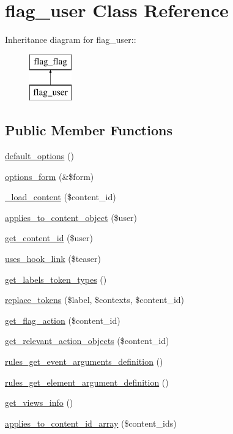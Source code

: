 \hypertarget{classflag__user}{
\section{flag\_\-user Class Reference}
\label{classflag__user}
}
Inheritance diagram for flag\_\-user::\begin{figure}[H]
\begin{center}
\leavevmode
\includegraphics[height=2cm]{classflag__user}
\end{center}
\end{figure}
\subsection*{Public Member Functions}
\begin{CompactItemize}
\item 
\hyperlink{classflag__user_5df658a9df123b09608c3438a06fe86e}{default\_\-options} ()
\item 
\hyperlink{classflag__user_2a425815ad46c2ffd8f48ded77d06231}{options\_\-form} (\&\$form)
\item 
\hyperlink{classflag__user_93152c6302f304279dba89e4b81af658}{\_\-load\_\-content} (\$content\_\-id)
\item 
\hyperlink{classflag__user_1166b6c58dbd8074dd5187f3c5b84c8b}{applies\_\-to\_\-content\_\-object} (\$user)
\item 
\hyperlink{classflag__user_3cb6ed47377662232c4f41bfe2f41f09}{get\_\-content\_\-id} (\$user)
\item 
\hyperlink{classflag__user_279b08bbeb85bdd35710b25e94ebba81}{uses\_\-hook\_\-link} (\$teaser)
\item 
\hyperlink{classflag__user_08790af167b1f4b273b5b8af7d3677b7}{get\_\-labels\_\-token\_\-types} ()
\item 
\hyperlink{classflag__user_7f311816450a6101d5ea132a41016d51}{replace\_\-tokens} (\$label, \$contexts, \$content\_\-id)
\item 
\hyperlink{classflag__user_6b753497cc4bd54f8328b8d0e7185142}{get\_\-flag\_\-action} (\$content\_\-id)
\item 
\hyperlink{classflag__user_92be6b0492226ca0feb1f2dc486d519e}{get\_\-relevant\_\-action\_\-objects} (\$content\_\-id)
\item 
\hyperlink{classflag__user_1773406a095155a3a1f6f8c0f099b85a}{rules\_\-get\_\-event\_\-arguments\_\-definition} ()
\item 
\hyperlink{classflag__user_7ff3a7690719f97b18be24006586f083}{rules\_\-get\_\-element\_\-argument\_\-definition} ()
\item 
\hyperlink{classflag__user_6964b8042fb9bb01e197705be533abba}{get\_\-views\_\-info} ()
\item 
\hyperlink{classflag__user_0ccc7caff183a9e9067d49a89917c003}{applies\_\-to\_\-content\_\-id\_\-array} (\$content\_\-ids)
\end{CompactItemize}


